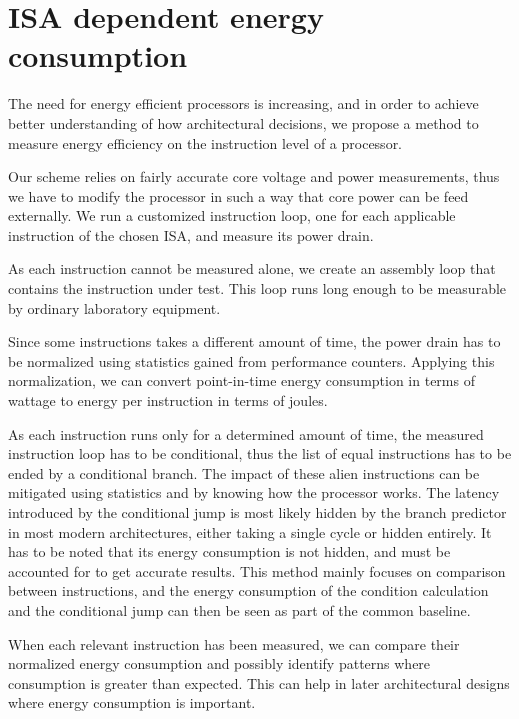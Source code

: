 \section{ISA dependent energy consumption}

The need for energy efficient processors is increasing, and in order to achieve
better understanding of how architectural decisions, we propose a method to
measure energy efficiency on the instruction level of a processor.

Our scheme relies on fairly accurate core voltage and power measurements, thus
we have to modify the processor in such a way that core power can be feed
externally.  We run a customized instruction loop, one for each applicable
instruction of the chosen ISA, and measure its power drain.

As each instruction cannot be measured alone, we create an assembly loop that
contains the instruction under test. This loop runs long enough to be measurable
by ordinary laboratory equipment.

Since some instructions takes a different amount of time, the power drain has to be
normalized using statistics gained from performance counters. Applying this
normalization, we can convert point-in-time energy consumption in terms of
wattage to energy per instruction in terms of joules.

As each instruction runs only for a determined amount of time, the measured
instruction loop has to be conditional, thus the list of equal instructions has
to be ended by a conditional branch. The impact of these alien instructions
can be mitigated using statistics and by knowing how the processor works. The
latency introduced by the conditional jump is most likely hidden by the branch
predictor in most modern architectures, either taking a single cycle or hidden
entirely. It has to be noted that its energy consumption is not hidden, and must
be accounted for to get accurate results. This method mainly focuses on
comparison between instructions, and the energy consumption of the condition
calculation and the conditional jump can then be seen as part of the common
baseline.

When each relevant instruction has been measured, we can compare their
normalized energy consumption and possibly identify patterns where consumption
is greater than expected. This can help in later architectural designs where
energy consumption is important.


